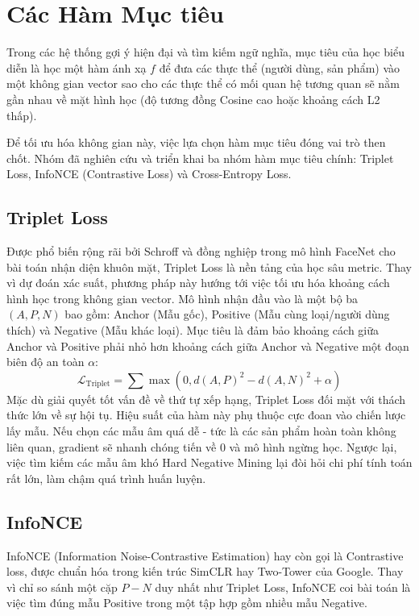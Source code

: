 \section{Các Hàm Mục tiêu}

Trong các hệ thống gợi ý hiện đại và tìm kiếm ngữ nghĩa, mục tiêu của học biểu diễn là học một hàm ánh xạ $f$ để đưa các thực thể (người dùng, sản phẩm) vào một không gian vector sao cho các thực thể có mối quan hệ tương quan sẽ nằm gần nhau về mặt hình học (độ tương đồng Cosine cao hoặc khoảng cách L2 thấp).

Để tối ưu hóa không gian này, việc lựa chọn hàm mục tiêu đóng vai trò then chốt. Nhóm đã nghiên cứu và triển khai ba nhóm hàm mục tiêu chính: Triplet Loss, InfoNCE (Contrastive Loss) và Cross-Entropy Loss.

\subsection{Triplet Loss}

Được phổ biến rộng rãi bởi Schroff và đồng nghiệp\cite{23} trong mô hình FaceNet cho bài toán nhận diện khuôn mặt, Triplet Loss là nền tảng của học sâu metric. Thay vì dự đoán xác suất, phương pháp này hướng tới việc tối ưu hóa khoảng cách hình học trong không gian vector. Mô hình nhận đầu vào là một bộ ba $(A, P, N)$ bao gồm: Anchor (Mẫu gốc), Positive (Mẫu cùng loại/người dùng thích) và Negative (Mẫu khác loại). Mục tiêu là đảm bảo khoảng cách giữa Anchor và Positive phải nhỏ hơn khoảng cách giữa Anchor và Negative một đoạn biên độ an toàn $\alpha$:
\begin{equation}
    \mathcal{L}_{\text{Triplet}} = \sum \max \left( 0, d(A, P)^2 - d(A, N)^2 + \alpha \right)
\end{equation}
Mặc dù giải quyết tốt vấn đề về thứ tự xếp hạng, Triplet Loss đối mặt với thách thức lớn về sự hội tụ. Hiệu suất của hàm này phụ thuộc cực đoan vào chiến lược lấy mẫu. Nếu chọn các mẫu âm quá dễ - tức là các sản phẩm hoàn toàn không liên quan, gradient sẽ nhanh chóng tiến về 0 và mô hình ngừng học. Ngược lại, việc tìm kiếm các mẫu âm khó Hard Negative Mining lại đòi hỏi chi phí tính toán rất lớn, làm chậm quá trình huấn luyện.

\subsection{InfoNCE}
InfoNCE (Information Noise-Contrastive Estimation) hay còn gọi là Contrastive loss, được chuẩn hóa trong kiến trúc SimCLR hay Two-Tower của Google\cite{8}. Thay vì chỉ so sánh một cặp $P - N$ duy nhất như Triplet Loss, InfoNCE coi bài toán là việc tìm đúng mẫu Positive trong một tập hợp gồm nhiều mẫu Negative.

